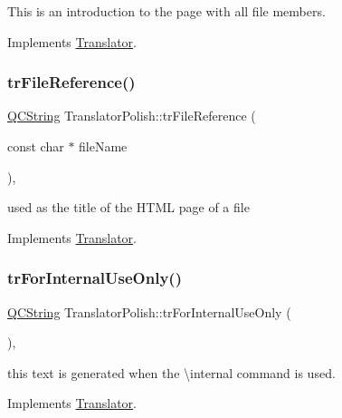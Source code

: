 This is an introduction to the page with all file members. 

Implements \mbox{\hyperlink{class_translator}{Translator}}.

\mbox{\label{class_translator_polish_a48b145d50b8529cb0164837701064360}} 
\subsubsection{\texorpdfstring{trFileReference()}{trFileReference()}}
{\footnotesize\ttfamily \mbox{\hyperlink{class_q_c_string}{Q\+C\+String}} Translator\+Polish\+::tr\+File\+Reference (\begin{DoxyParamCaption}\item[{const char $\ast$}]{file\+Name }\end{DoxyParamCaption})\hspace{0.3cm}{\ttfamily [inline]}, {\ttfamily [virtual]}}

used as the title of the H\+T\+ML page of a file 

Implements \mbox{\hyperlink{class_translator}{Translator}}.

\mbox{\label{class_translator_polish_a75a159a05f97393a3032f4a7a9e0814f}} 
\subsubsection{\texorpdfstring{trForInternalUseOnly()}{trForInternalUseOnly()}}
{\footnotesize\ttfamily \mbox{\hyperlink{class_q_c_string}{Q\+C\+String}} Translator\+Polish\+::tr\+For\+Internal\+Use\+Only (\begin{DoxyParamCaption}{ }\end{DoxyParamCaption})\hspace{0.3cm}{\ttfamily [inline]}, {\ttfamily [virtual]}}

this text is generated when the \textbackslash{}internal command is used. 

Implements \mbox{\hyperlink{class_translator}{Translator}}.

\mbox{\label{class_translator_polish_a61ee64087632405298cd2fd92615baa7}} 
